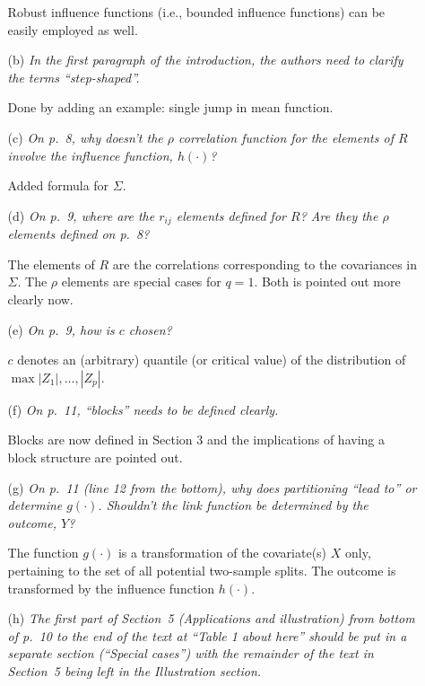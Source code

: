 \documentclass[11pt,a4paper]{article}
\begin{document}
\begin{enumerate}
\begin{itemize}
	       Robust influence functions (i.e., bounded influence functions) can
	       be easily employed as well.
	       
    \item[(b)] \textit{In the first paragraph of the introduction, the authors need to
               clarify the terms ``step-shaped''.}
	       
	       Done by adding an example: single jump in mean function.
	       
    \item[(c)] \textit{On p.~8, why doesn't the $\rho$ correlation function for the
               elements of $R$ involve the influence function, $h(\cdot)$?}
	       
	       Added formula for $\Sigma$.
	       
    \item[(d)] \textit{On p.~9, where are the $r_{ij}$ elements defined for $R$? Are
               they the $\rho$ elements defined on p.~8?}
    
               The elements of $R$ are the correlations corresponding to the covariances
	       in $\Sigma$. The $\rho$ elements are special cases for $q = 1$.
	       Both is pointed out more clearly now.

    \item[(e)] \textit{On p.~9, how is $c$ chosen?}
    
               $c$ denotes an (arbitrary) quantile (or critical value) of the distribution
	       of $\max  |Z_1|, \dots, |Z_p|$.
	       
    \item[(f)] \textit{On p.~11, ``blocks'' needs to be defined clearly.}
               
	       Blocks are now defined in Section 3 and the implications
               of having a block structure are pointed out.
               
	       
    \item[(g)] \textit{On p.~11 (line 12 from the bottom), why does partitioning 
               ``lead to'' or determine $g(\cdot)$. Shouldn't the link function be
	       determined by the outcome, $Y$?}
	       
	       The function $g(\cdot)$ is a transformation of the covariate(s) $X$
	       only, pertaining to the set of all potential two-sample splits.
	       The outcome is transformed by the influence function $h(\cdot)$.
	       
    \item[(h)] \textit{The first part of Section~5 (Applications and illustration)
              from bottom of p.~10 to the end of the text at ``Table 1 about here''
	       should be put in a separate section (``Special cases'') with the
	       remainder of the text in Section~5 being left in the Illustration
	       section.}
	       

\end{itemize}
\end{enumerate}
\end{document}
